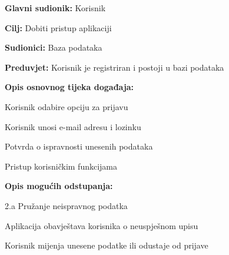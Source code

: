 \documentclass[times, utf8, zavrsni]{fer}
\newenvironment{packed_enum}{
	\begin{enumerate}
		\setlength{\itemsep}{0pt}
		\setlength{\parskip}{0pt}
		\setlength{\parsep}{0pt}
	}{\end{enumerate}}
\newenvironment{packed_item}{
	\begin{itemize}
		\setlength{\itemsep}{0pt}
		\setlength{\parskip}{0pt}
		\setlength{\parsep}{0pt}
	}{\end{itemize}}
\begin{document}
		    \noindent {}
					\begin{packed_item}
						
						\item \textbf{Glavni sudionik: } Korisnik
						\item  \textbf{Cilj:} Dobiti pristup aplikaciji
						\item  \textbf{Sudionici:} Baza podataka
						\item  \textbf{Preduvjet:} Korisnik je registriran i postoji u bazi podataka
						\item  \textbf{Opis osnovnog tijeka događaja:}
						
						\item[] \begin{packed_enum}
							
							\item Korisnik odabire opciju za prijavu
							\item Korisnik unosi e-mail adresu i lozinku
							\item Potvrda o ispravnosti unesenih podataka
							\item Pristup korisničkim funkcijama
							
						\end{packed_enum}
						
						\item  \textbf{Opis mogućih odstupanja:}
						
						\item[] \begin{packed_item}
							
							\item[2.a] Pružanje neispravnog podatka
							\item[] \begin{packed_enum}
								
								\item Aplikacija obavještava korisnika o neuspješnom upisu
								\item Korisnik mijenja unesene podatke ili odustaje od prijave
								
							\end{packed_enum}
							
						\end{packed_item}
					\end{packed_item}
					
\end{document}
